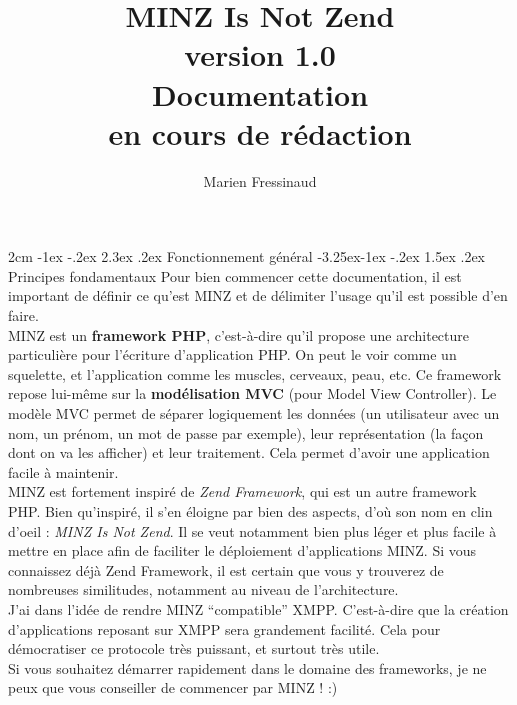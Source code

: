 \documentclass[a4paper,11pt]{article}
\title{MINZ Is Not Zend\\{\small version 1.0}\\\textbf{Documentation\\ {\small en cours de rédaction}}}
\author{Marien Fressinaud}
\makeatletter
\renewcommand\section{\@startsection{section}{1}{\z@}%
	{2cm \@plus -1ex \@minus -.2ex}%
	{2.3ex \@plus.2ex}%
	{\color{bleuClair}\reset@font\Large\bfseries}}
\renewcommand{\subsection}{\@startsection{subsection}{2}{\z@}%
             {-3.25ex\@plus -1ex \@minus -.2ex}%
             {1.5ex \@plus .2ex}%
             {\color{bleuFonce}\normalfont\large\bfseries}}
\makeatother
\begin{document}
\maketitle

\newpage
\tableofcontents
\newpage
\section{Fonctionnement général}
\subsection{Principes fondamentaux}
Pour bien commencer cette documentation, il est important de définir ce qu'est MINZ et de délimiter l'usage qu'il est possible d'en faire.\\

MINZ est un \textbf{framework PHP}, c'est-à-dire qu'il propose une architecture particulière pour l'écriture d'application PHP. On peut le voir comme un squelette, et l'application comme les muscles, cerveaux, peau, etc. Ce framework repose lui-même sur la \textbf{modélisation MVC} (pour Model View Controller). Le modèle MVC permet de séparer logiquement les données (un utilisateur avec un nom, un prénom, un mot de passe par exemple), leur représentation (la façon dont on va les afficher) et leur traitement. Cela permet d'avoir une application facile à maintenir.\\

MINZ est fortement inspiré de \textit{Zend Framework}, qui est un autre framework PHP. Bien qu'inspiré, il s'en éloigne par bien des aspects, d'où son nom en clin d'oeil : \textit{MINZ Is Not Zend}. Il se veut notamment bien plus léger et plus facile à mettre en place afin de faciliter le déploiement d'applications MINZ. Si vous connaissez déjà Zend Framework, il est certain que vous y trouverez de nombreuses similitudes, notamment au niveau de l'architecture.\\

J'ai dans l'idée de rendre MINZ ``compatible'' XMPP. C'est-à-dire que la création d'applications reposant sur XMPP sera grandement facilité. Cela pour démocratiser ce protocole très puissant, et surtout très utile.\\

Si vous souhaitez démarrer rapidement dans le domaine des frameworks, je ne peux que vous conseiller de commencer par MINZ ! :)
\end{document}
